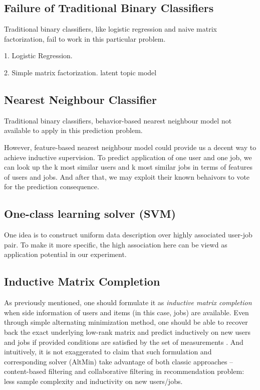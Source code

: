 \documentclass{article} %
\begin{document}
\subsection{Failure of Traditional Binary Classifiers} %
Traditional binary classifiers, like logistic regression and naive matrix
factorization, fail to work in this particular problem. 

1. Logistic Regression.

2. Simple matrix factorization. latent topic model 

\subsection{Nearest Neighbour Classifier} %
Traditional binary classifiers, behavior-based nearest neighbour model
not available to apply in this prediction problem.

However, feature-based nearest neighbour model could provide us a decent way
to achieve inductive supervision. To predict application of one user and one
job, we can look up the k most similar users and k most similar jobs in terms
of features of users and jobs. And after that, we may exploit their known
behaivors to vote for the prediction consequence.

\subsection{One-class learning solver (SVM)} %
One idea is to construct uniform data description over highly associated
user-job pair. To make it more specific, the high association here can be
viewd as application potential in our experiment.

\subsection{Inductive Matrix Completion} %
As previously mentioned, one should formulate it as {\it inductive matrix
    completion} when side information of users and items (in this case, jobs)
are available. 
Even through simple alternating minimization method, one should be able to
recover back the exact underlying low-rank matrix and predict inductively on
new users and jobs if provided conditions are satisfied by the set of
measurements \cite{jain2013provable}. 
And intuitively, it is not exaggerated to claim that such formulation and
corresponding solver (AltMin) take advantage of both classic approaches -- content-based
filtering and collaborative filtering in recommendation problem: 
    less sample complexity and inductivity on new users/jobs. 
\end{document}
